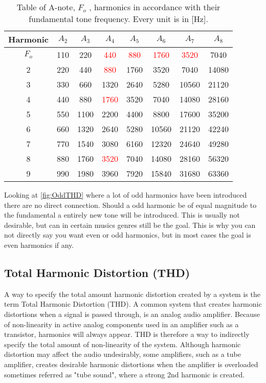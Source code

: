 \begin{table}[H]
\centering
{}
\begin{tabular}{S[table-format=1]ccccccc} \toprule
    {Harmonic} & {$A_2$} & {$A_3$} & {$A_4$} & {$A_5$} & {$A_6$} & {$A_7$} & {$A_8$} \\ \midrule 
    $F_o$  & 110  & 220  & \textcolor{red}{440}   & \textcolor{red}{880}  & \textcolor{red}{1760}  & \textcolor{red}{3520}   & 7040   \\       & 220  & 440  & \textcolor{red}{880}   & 1760 & 3520   & 7040   & 14080  \\ 
    3      & 330  & 660  & 1320  & 2640 & 5280   & 10560  & 21120  \\
    4      & 440  & 880  & \textcolor{red}{1760}  & 3520 & 7040   & 14080  & 28160  \\ 
    5      & 550  & 1100 & 2200  & 4400 & 8800   & 17600  & 35200  \\       & 660  & 1320 & 2640  & 5280 & 10560  & 21120  & 42240  \\
    7      & 770  & 1540 & 3080  & 6160 & 12320  & 24640  & 49280  \\
    8      & 880  & 1760 & \textcolor{red}{3520}  & 7040 & 14080  & 28160  & 56320  \\ 
    9      & 990  & 1980 & 3960  & 7920 & 15840  & 31680  & 63360  \\ \bottomrule
\end{tabular}
\caption{Table of A-note, $F_o$ , harmonics in accordance with their fundamental tone frequency. Every unit is in [Hz].\citep{sou:NoteA}}
\label{tab:NoteA4}
\end{table}

Looking at \autoref{fig:OddTHD} where a lot of odd harmonics have been introduced there are no direct connection. Should a odd harmonic be of equal magnitude to the fundamental a entirely  new tone will be introduced. This is usually not desirable, but can in certain musics genres still be the goal. This is why you can not directly say you want even or odd harmonics, but in most cases the goal is even harmonics if any.

\subsection{Total Harmonic Distortion (THD)}

A way to specify the total amount harmonic distortion created by a system is  the term Total Harmonic Distortion (THD). A common system that creates harmonic distortions when a signal is passed through, is an analog audio amplifier. Because of non-linearity in active analog components used in an amplifier such as a transistor, harmonics will always appear. THD is therefore a way to indirectly specify the total amount of non-linearity of the system. Although harmonic distortion may affect the audio undesirably, some amplifiers, such as a tube amplifier, creates desirable harmonic distortions when the amplifier is overloaded sometimes referred as "tube sound", where a strong 2nd harmonic is created. 

